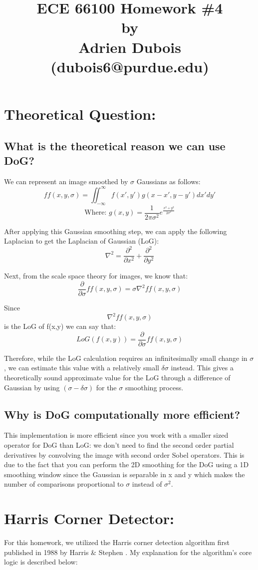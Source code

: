\documentclass{article}
\title{\Large \textbf{ECE 66100 Homework \#4\\[0.1in] by\\ [0.1in] Adrien Dubois (dubois6@purdue.edu)}}
\begin{document}
\maketitle
\tableofcontents
\section{Theoretical Question:}
\subsection{What is the theoretical reason we can use DoG?}
We can represent an image smoothed by $\sigma$ Gaussians as follows:
\[ff(x, y, \sigma) = \iint_{-\infty}^{\infty} f(x', y') g(x-x',y-y')dx'dy'\]
\[\text{Where: } g(x,y) = \frac{1}{2\pi\sigma^2} e ^{\frac{x^2+y^2}{2\sigma^2}}\]

After applying this Gaussian smoothing step, we can apply the following Laplacian to get the Laplacian of Gaussian (LoG):
\[\nabla ^2 = \frac{\partial^2}{\partial x^2} + \frac{\partial ^2}{\partial y^2}\]

Next, from the scale space theory for images, we know that:
\[\frac{\partial}{\partial \sigma} ff(x,y,\sigma) = \sigma \nabla ^2 ff(x, y, \sigma)\]

Since \[\nabla ^2 ff(x, y, \sigma)\] is the LoG of f(x,y) we can say that:
\[LoG(f(x,y)) = \frac{\partial}{\partial \sigma} ff(x,y,\sigma)\]

Therefore, while the LoG calculation requires an infinitesimally small change in $\sigma$, we can estimate this value with a relatively small $\delta \sigma$ instead. This gives a theoretically sound approximate value for the LoG through a difference of Gaussian by using $(\sigma - \delta \sigma)$ for the $\sigma$ smoothing process.

\subsection{Why is DoG computationally more efficient?}
This implementation is more efficient since you work with a smaller sized operator for DoG than LoG: we don't need to find the second order partial derivatives by convolving the image with second order Sobel operators.  This is due to the fact that you can perform the 2D smoothing for the DoG using a 1D smoothing window since the Gaussian is separable in x and y which makes the number of comparisons proportional to $\sigma$ instead of $\sigma ^2$. 

\section{Harris Corner Detector:}
For this homework, we utilized the Harris corner detection algorithm first published in 1988 by Harris \& Stephen \cite{Harris1988ACC}. My explanation for the algorithm's core logic is described below:
\end{document}
